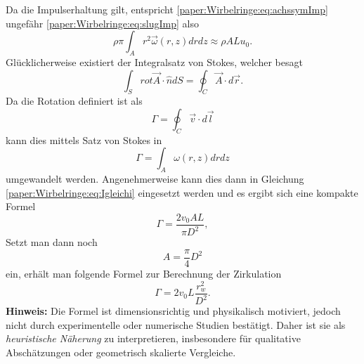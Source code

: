 Da die Impulserhaltung gilt, entspricht \eqref{paper:Wirbelringe:eq:achssymImp} ungefähr \eqref{paper:Wirbelringe:eq:slugImp} also
\begin{equation}
    \rho\pi\int_{A}r^2\vec{\omega}(r,z)drdz
    \approx
    \rho ALu_0
    \label{paper:Wirbelringe:eq:Igleichi}.
\end{equation}
Glücklicherweise existiert der Integralsatz von Stokes, welcher besagt
\begin{equation*}
    \int_{S}rot\vec{A}\cdot\hat{n}dS 
    =
    \oint_{C}\vec{A}\cdot d\vec{r}.
\end{equation*}
Da die Rotation definiert ist als 
\begin{equation*}
    \Gamma
    =
    \oint_{C}\vec{v}\cdot d\vec{l}
\end{equation*}
kann dies mittels Satz von Stokes in
\begin{equation*}
    \Gamma
    =
    \int_{A}\omega(r,z)drdz
\end{equation*}
umgewandelt werden.
Angenehmerweise kann dies dann in Gleichung \eqref{paper:Wirbelringe:eq:Igleichi} eingesetzt werden und es ergibt sich eine kompakte Formel
\begin{equation*}
    \Gamma
    =
    \frac{2v_0AL}{\pi D^2},
\end{equation*}
Setzt man dann noch 
\begin{equation*}
    A
    =
    \frac{\pi}{4} D^2
\end{equation*}
ein, erhält man folgende Formel zur Berechnung der Zirkulation
\begin{equation*}
    \Gamma
    =
    2v_0L\frac{r_w^2}{D^2}.
\end{equation*}
\textbf{Hinweis:}
Die Formel ist dimensionsrichtig und physikalisch motiviert, jedoch nicht durch experimentelle oder numerische Studien bestätigt.
Daher ist sie als \emph{heuristische Näherung} zu interpretieren, insbesondere für qualitative Abschätzungen oder geometrisch skalierte Vergleiche.